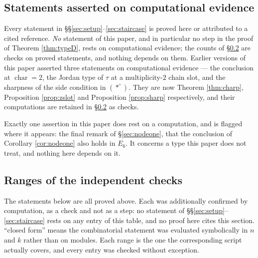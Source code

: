 \documentclass[reqno]{amsart}
\theoremstyle{plain}
\theoremstyle{definition}
\begin{document}
\subsection{Statements asserted on computational evidence}\label{ss:evidence}
Every statement in \S\S\ref{sec:setup}--\ref{sec:staircase} is proved here or
attributed to a cited reference.  \emph{No} statement of this paper, and in
particular no step in the proof of Theorem \ref{thm:typeD}, rests on
computational evidence; the counts of \S\ref{ss:checks} are checks on proved
statements, and nothing depends on them.  Earlier versions of this paper
asserted three statements on computational evidence --- the conclusion at
$\operatorname{char}=2$, the Jordan type of $\tau$ at a multiplicity-$2$ chain
slot, and the sharpness of the side condition in $(*^\circ)$.  They are now
Theorem \ref{thm:charp}, Proposition \ref{prop:zslot} and Proposition
\ref{prop:sharp} respectively, and their computations are retained in
\S\ref{ss:checks} as checks.

Exactly one assertion in this paper does rest on a computation, and is flagged
where it appears: the final remark of \S\ref{sec:nodeone}, that the conclusion
of Corollary \ref{cor:nodeone} also holds in $E_6$.  It concerns a type this
paper does not treat, and nothing here depends on it.

\subsection{Ranges of the independent checks}\label{ss:checks}
The statements below are all proved above.  Each was additionally confirmed by
computation, as a check and not as a step: no statement of
\S\S\ref{sec:setup}--\ref{sec:staircase} rests on any entry of this table, and
no proof here cites this section.  ``closed form'' means the combinatorial
statement was evaluated symbolically in $n$ and $k$ rather than on modules.
Each range is the one the corresponding script actually covers, and every
entry was checked without exception.
\end{document}
